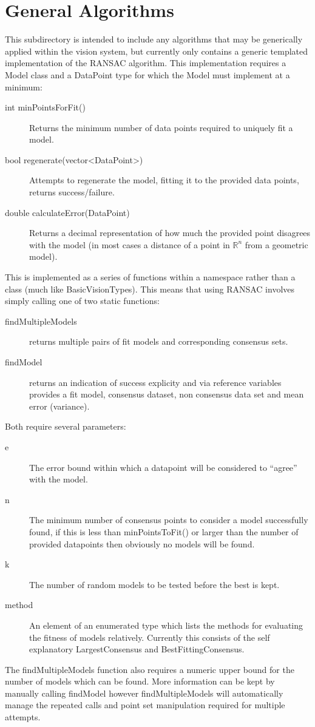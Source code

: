 \documentclass[]{report}
\begin{document}
\section{General Algorithms}
This subdirectory is intended to include any algorithms that may be generically applied within the vision system, but currently only contains a generic templated implementation of the RANSAC algorithm. This  implementation requires a Model class and a DataPoint type for which the Model must implement at a minimum:
\begin{description}
\item[int minPointsForFit()] Returns the minimum number of data points required to uniquely fit a model.
\item[bool regenerate(vector<DataPoint>)] Attempts to regenerate the model, fitting it to the provided data points, returns success/failure.
\item[double calculateError(DataPoint)] Returns a decimal representation of how much the provided point disagrees with the model (in most cases a distance of a point in $\mathbb{R}^n$ from a geometric model).
\end{description}
This is implemented as a series of functions within a namespace rather than a class (much like BasicVisionTypes). This means that using RANSAC involves simply calling one of two static functions:
\begin{description}
\item[findMultipleModels] returns multiple pairs of fit models and corresponding consensus sets.
\item[findModel] returns an indication of success explicity and via reference variables provides a fit model, consensus dataset, non consensus data set and mean error (variance).
\end{description}

Both require several parameters:
\begin{description}
\item[e] The error bound within which a datapoint will be considered to ``agree'' with the model.
\item[n] The minimum number of consensus points to consider a model successfully found, if this is less than minPointsToFit() or larger than the number of provided datapoints then obviously no models will be found.
\item[k] The number of random models to be tested before the best is kept.
\item[method] An element of an enumerated type which lists the methods for evaluating the fitness of models relatively. Currently this consists of the self explanatory LargestConsensus and BestFittingConsensus.
\end{description}
The findMultipleModels function also requires a numeric upper bound for the number of models which can be found. More information can be kept by manually calling findModel however findMultipleModels will automatically manage the repeated calls and point set manipulation required for multiple attempts.
\end{document}
